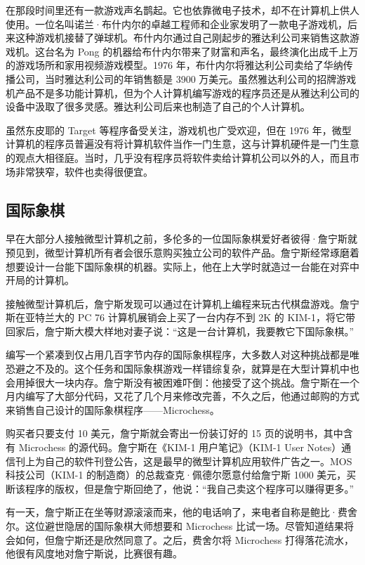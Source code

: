 \documentclass[12pt,UTF8]{ctexbook}
\begin{document}
在那段时间里还有一款游戏声名鹊起。它也依靠微电子技术，却不在计算机上供人使用。一位名叫诺兰·布什内尔的卓越工程师和企业家发明了一款电子游戏机，后来这种游戏机接替了弹球机。布什内尔通过自己刚起步的雅达利公司来销售这款游戏机。这台名为 Pong 的机器给布什内尔带来了财富和声名，最终演化出成千上万的游戏场所和家用视频游戏模型。1976 年，布什内尔将雅达利公司卖给了华纳传播公司，当时雅达利公司的年销售额是 3900 万美元。虽然雅达利公司的招牌游戏机产品不是多功能计算机，但为个人计算机编写游戏的程序员还是从雅达利公司的设备中汲取了很多灵感。雅达利公司后来也制造了自己的个人计算机。

虽然东皮耶的 Target 等程序备受关注，游戏机也广受欢迎，但在 1976 年，微型计算机的程序员普遍没有将计算机软件当作一门生意，这与计算机硬件是一门生意的观点大相径庭。当时，几乎没有程序员将软件卖给计算机公司以外的人，而且市场非常狭窄，软件也卖得很便宜。





\subsection{国际象棋}


早在大部分人接触微型计算机之前，多伦多的一位国际象棋爱好者彼得·詹宁斯就预见到，微型计算机所有者会很乐意购买独立公司的软件产品。詹宁斯经常琢磨着想要设计一台能下国际象棋的机器。实际上，他在上大学时就造过一台能在对弈中开局的计算机。

接触微型计算机后，詹宁斯发现可以通过在计算机上编程来玩古代棋盘游戏。詹宁斯在亚特兰大的 PC 76 计算机展销会上买了一台内存不到 2K 的 KIM-1，将它带回家后，詹宁斯大模大样地对妻子说：“这是一台计算机，我要教它下国际象棋。”

编写一个紧凑到仅占用几百字节内存的国际象棋程序，大多数人对这种挑战都是唯恐避之不及的。这个任务和国际象棋游戏一样错综复杂，就算是在大型计算机中也会用掉很大一块内存。詹宁斯没有被困难吓倒：他接受了这个挑战。詹宁斯在一个月内编写了大部分代码，又花了几个月来修改完善，不久之后，他通过邮购的方式来销售自己设计的国际象棋程序——Microchess。

购买者只要支付 10 美元，詹宁斯就会寄出一份装订好的 15 页的说明书，其中含有 Microchess 的源代码。詹宁斯在《KIM-1 用户笔记》（KIM-1 User Notes）通信刊上为自己的软件刊登公告，这是最早的微型计算机应用软件广告之一。MOS 科技公司（KIM-1 的制造商）的总裁查克·佩德尔愿意付给詹宁斯 1000 美元，买断该程序的版权，但是詹宁斯回绝了，他说：“我自己卖这个程序可以赚得更多。”

有一天，詹宁斯正在坐等财源滚滚而来，他的电话响了，来电者自称是鲍比·费舍尔。这位避世隐居的国际象棋大师想要和 Microchess 比试一场。尽管知道结果将会如何，但詹宁斯还是欣然同意了。之后，费舍尔将 Microchess 打得落花流水，他很有风度地对詹宁斯说，比赛很有趣。
\end{document}
